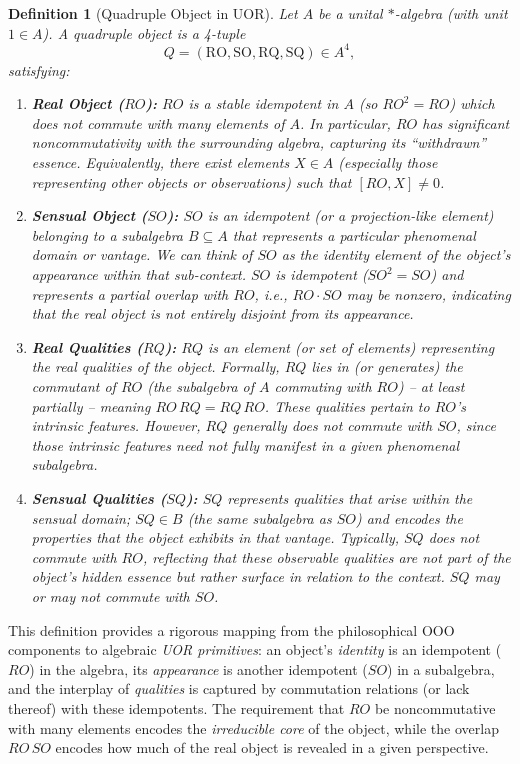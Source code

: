 \documentclass[12pt]{article}
\newtheorem{definition}{Definition}[section]
\begin{document}
\begin{definition}[Quadruple Object in UOR]
Let $A$ be a unital $*$-algebra (with unit $1\in A$). A \emph{quadruple object} is a 4-tuple 
\[
Q = (\mathrm{RO}, \mathrm{SO}, \mathrm{RQ}, \mathrm{SQ}) \in A^4,
\]
satisfying:
\begin{enumerate}
    \item \textbf{Real Object ($RO$):} $RO$ is a \emph{stable idempotent} in $A$ (so $RO^2 = RO$) which does \emph{not} commute with many elements of $A$. In particular, $RO$ has significant noncommutativity with the surrounding algebra, capturing its ``withdrawn'' essence. Equivalently, there exist elements $X\in A$ (especially those representing other objects or observations) such that $[RO, X] \neq 0$.
    \item \textbf{Sensual Object ($SO$):} $SO$ is an idempotent (or a projection-like element) belonging to a subalgebra $B \subseteq A$ that represents a particular \emph{phenomenal domain or vantage}. We can think of $SO$ as the identity element of the object’s appearance within that sub-context. $SO$ is idempotent ($SO^2 = SO$) and represents a \emph{partial overlap} with $RO$, i.e., $RO \cdot SO$ may be nonzero, indicating that the real object is not entirely disjoint from its appearance.
    \item \textbf{Real Qualities ($RQ$):} $RQ$ is an element (or set of elements) representing the \emph{real qualities} of the object. Formally, $RQ$ lies in (or generates) the \emph{commutant} of $RO$ (the subalgebra of $A$ commuting with $RO$) -- at least partially -- meaning $RO\,RQ = RQ\,RO$. These qualities pertain to $RO$’s intrinsic features. However, $RQ$ generally does \emph{not} commute with $SO$, since those intrinsic features need not fully manifest in a given phenomenal subalgebra.
    \item \textbf{Sensual Qualities ($SQ$):} $SQ$ represents qualities that arise \emph{within the sensual domain}; $SQ \in B$ (the same subalgebra as $SO$) and encodes the properties that the object exhibits in that vantage. Typically, $SQ$ does \emph{not} commute with $RO$, reflecting that these observable qualities are not part of the object’s hidden essence but rather surface in relation to the context. $SQ$ may or may not commute with $SO$.
\end{enumerate}
\end{definition}

This definition provides a rigorous mapping from the philosophical OOO components to algebraic \emph{UOR primitives}: an object’s \emph{identity} is an idempotent ($RO$) in the algebra, its \emph{appearance} is another idempotent ($SO$) in a subalgebra, and the interplay of \emph{qualities} is captured by commutation relations (or lack thereof) with these idempotents. The requirement that $RO$ be noncommutative with many elements encodes the \emph{irreducible core} of the object, while the overlap $RO\,SO$ encodes how much of the real object is revealed in a given perspective.
\end{document}
